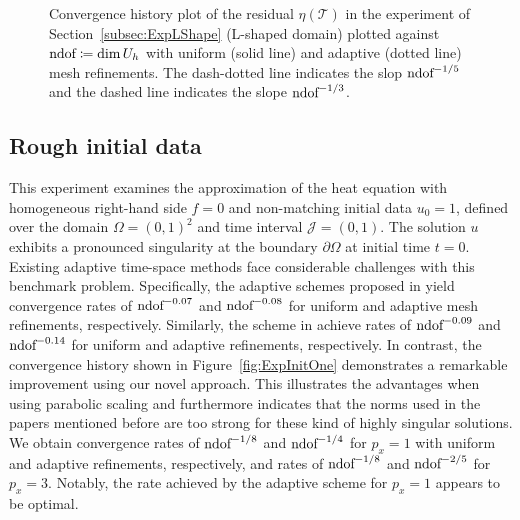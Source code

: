\documentclass{amsart}
\providecommand{\tria}{\mathcal{T}}
\newcommand{\cJ}{\mathcal J}
\begin{document}
\begin{figure}
\caption{Convergence history plot of the residual $\eta(\tria)$ in the experiment of Section~\ref{subsec:ExpLShape} (L-shaped domain) plotted against $\textup{ndof} \coloneqq \dim U_h$ with uniform (solid line) and adaptive (dotted line) mesh refinements. The dash-dotted line indicates the slop $\textup{ndof}^{-1/5}$ and the dashed line indicates the slope $\textup{ndof}^{-1/3}$.}\label{fig:ExpLShape}
\end{figure}
\subsection{Rough initial data}\label{subsec:ExpRoughInit}
This experiment examines the approximation of the heat equation with homogeneous right-hand side $f = 0$ and non-matching initial data $u_0 = 1$, defined over the domain $\Omega = (0,1)^2$ and time interval $\cJ = (0,1)$. The solution $u$ exhibits a pronounced singularity at the boundary $\partial \Omega$ at initial time $t=0$. 
Existing adaptive time-space methods face considerable challenges with this benchmark problem. Specifically, the adaptive schemes proposed in \cite{FuehrerKarkulik21} yield convergence rates of $\textup{ndof}^{-0.07}$ and $\textup{ndof}^{-0.08}$ for uniform and adaptive mesh refinements, respectively. Similarly, the scheme in \cite{GantnerStevenson23} achieve rates of $\textup{ndof}^{-0.09}$ and $\textup{ndof}^{-0.14}$ for uniform and adaptive refinements, respectively. 
In contrast, the convergence history shown in Figure~\ref{fig:ExpInitOne} demonstrates a remarkable improvement using our novel approach.
This illustrates the advantages when using parabolic scaling and furthermore indicates that the norms used in the papers mentioned before are too strong for these kind of highly singular solutions. We obtain convergence rates of $\textup{ndof}^{-1/8}$ and $\textup{ndof}^{-1/4}$ for $p_x = 1$ with uniform and adaptive refinements, respectively, and rates of $\textup{ndof}^{-1/8}$ and $\textup{ndof}^{-2/5}$ for $p_x = 3$. Notably, the rate achieved by the adaptive scheme for $p_x=1$ appears to be optimal. 
\end{document}
